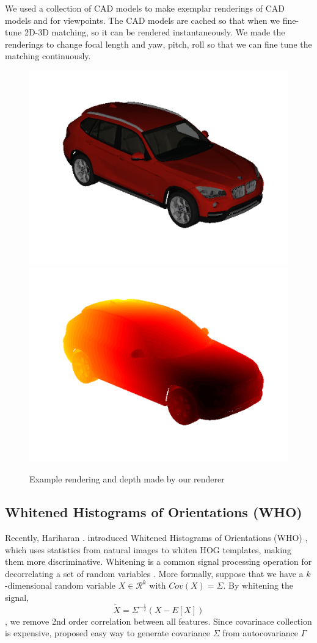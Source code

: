 \documentclass[10pt,twocolumn,letterpaper]{article}
\begin{document}
We used a collection of CAD models to make exemplar renderings of CAD models and for viewpoints. The
CAD models are cached so that when we fine-tune 2D-3D matching, so it can be rendered instantaneously.
We made the renderings to change focal length and yaw, pitch, roll so that we can fine tune the matching
continuously.

\begin{figure}[t]
  \begin{center}
     \includegraphics[width=0.4\linewidth]{rendering}
     \includegraphics[width=0.4\linewidth]{depth}
  \end{center}
  \caption{Example rendering and depth made by our renderer}
  \label{fig:rendering}
\end{figure}


\subsection{Whitened Histograms of Orientations (WHO)}
\label{sec:who}
Recently, Hariharan \etal. introduced Whitened Histograms of Orientations (WHO)
\cite{Hariharan12}, which uses statistics from natural images to whiten HOG
templates, making them more discriminative. Whitening is a common signal
processing operation for decorrelating a set of random variables
\cite{Martinsson05, Belouchrani00}. More formally, suppose that we have a
$k$-dimensional random variable $X \in \mathcal{R}^k$ with $Cov(X)=\Sigma$. By
whitening the signal,
\begin{equation}
\tilde{X}=\Sigma^{-\frac{1}{2}}(X - E[X]) \label{eq:whitening}
\end{equation}
, we remove 2nd order correlation between all features. Since covarinace
collection is expensive, \cite{Hariharan12} proposed easy way to generate
covariance $\Sigma$ from autocovariance $\Gamma$
\end{document}

